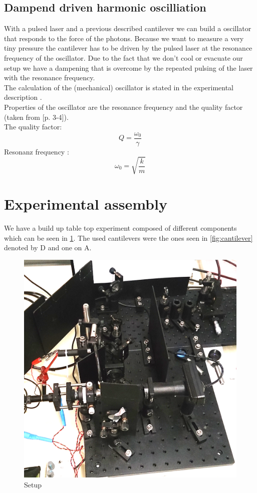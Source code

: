 \documentclass[12pt,a4paper]{article}
\begin{document}
\begin{multicols}{2}
\subsection{Dampend driven harmonic oscilliation}
With a pulsed laser and a previous described cantilever we can build a oscillator that responds to the force of the photons. Because we want to measure a very tiny pressure the cantilever has to be driven by the pulsed laser at the resonance frequency of the oscillator. Due to the fact that we don't cool or evacuate our setup we have a dampening that is overcome by the repeated pulsing of the laser with the resonance frequency.\\
The calculation of the (mechanical) oscillator is stated in the experimental description \cite{physikwiki}.\\
Properties of the oscillator are the resonance frequency and the quality factor (taken from \cite{physikwiki}[p. 3-4]).\\
The quality factor:
$$Q = \frac{\omega_{0}}{\gamma}$$
Resonanz frequency :
$$\omega_0 = \sqrt{\frac{k}{m}}$$

\section{Experimental assembly}
We have a build up table top experiment composed of different components which can be seen in \ref{fig:setup}. The used cantilevers were the ones seen in \ref{fig:cantilever} denoted by D and one on A.\\
\begin{figure}[H]
	\centering
	\includegraphics[scale=0.2]{../figures/aufbau.png}
	\caption{Setup}
	\label{fig:setup}
\end{figure}


\end{multicols}
\end{document}
